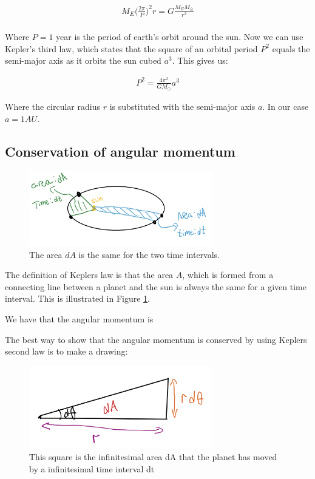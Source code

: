 \documentclass{article}
\begin{document}
\begin{align*}
    M_E\bigg(\frac{2\pi}{P}\bigg)^2r=G\frac{M_EM_{\odot}}{r^2}\\
\end{align*}

Where $P=1$ year is the period of earth's orbit around the sun.
Now we can use Kepler's third law, which states that the square of an orbital period $P^2$ equals the semi-major axis as it orbits the sun cubed $a^3$. This gives us:

\begin{align}
    P^2=\frac{4\pi^2}{GM_\odot}a^3
\end{align}

Where the circular radius $r$ is substituted with the semi-major axis $a$. In our case $a = 1AU$.  

\subsection{Conservation of angular momentum}

\begin{figure}[H]
	\centering
	\includegraphics[width=80mm]{K2L.jpg}
	\caption{The area $dA$ is the same for the two time intervals.}
	\label{fig:Kep}
\end{figure}

The definition of Keplers law is that the area $A$, which is formed from a connecting line between a planet and the sun is always the same for a given time interval. This is illustrated in Figure \ref{fig:Kep}.









We have that the angular momentum is 

The best way to show that the angular momentum is conserved by using Keplers second law is to make a drawing:

\begin{figure}[H]
	\centering
	\includegraphics[width=80mm]{sketch.jpg}
	\caption{This square is the infinitesimal area dA that the planet has moved by a infinitesimal time interval dt}
	\label{fig:1bplot}
\end{figure}
\end{document}
